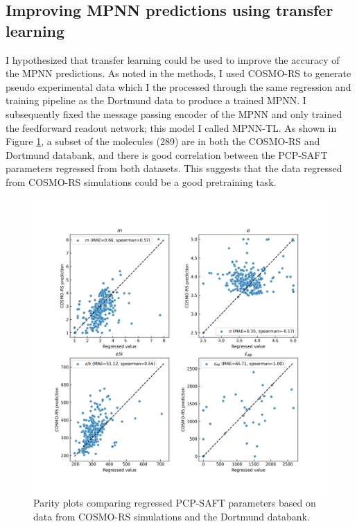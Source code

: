 \subsection{Improving MPNN predictions using transfer learning}

I hypothesized that transfer learning could be used to improve the accuracy of the MPNN predictions. As noted in the methods, I used COSMO-RS \cite{Klamt1995, Klamt2010} to generate pseudo experimental data which I the processed through the same regression and training pipeline as the Dortmund data to produce a trained MPNN. I subsequently fixed the message passing encoder of the MPNN and only trained the feedforward readout network; this model I called MPNN-TL. As shown in Figure \ref{fig:cosmo_dortmund}, a subset of the molecules (289) are in both the COSMO-RS and Dortmund databank\footnotemark, and there is good correlation between the PCP-SAFT parameters regressed from both datasets. This suggests that the data regressed from COSMO-RS simulations could be a good pretraining task. 

\begin{figure}
    \centering
    \includegraphics[width=\textwidth]{gfx/Chapter08/cosmo_dortmund_parameter_correlations.png}
    \caption{Parity plots comparing regressed PCP-SAFT parameters based on data from COSMO-RS simulations and the Dortmund databank.}
    \label{fig:cosmo_dortmund}
\end{figure}

